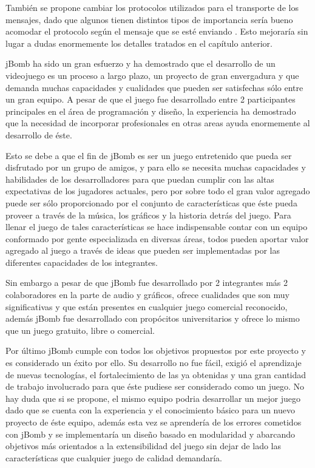 \documentclass[a4paper,12pt,openany,oneside]{book}
\begin{document}
También se propone cambiar los protocolos utilizados para el transporte de los mensajes, dado que algunos tienen distintos tipos de importancia sería bueno acomodar el protocolo según el mensaje que se esté enviando \cite{VALVE1}. Esto mejoraría sin lugar a dudas enormemente los detalles tratados en el capítulo anterior.

jBomb ha sido un gran esfuerzo y ha demostrado que el desarrollo de un videojuego es un proceso a largo plazo, un proyecto de gran envergadura y que demanda muchas capacidades y cualidades que pueden ser satisfechas sólo entre un gran equipo. A pesar de que el juego fue desarrollado entre 2 participantes principales en el área de programación y diseño, la experiencia ha demostrado que la necesidad de incorporar profesionales en otras areas ayuda enormemente al desarrollo de éste.

Esto se debe a que el fin de jBomb es ser un juego entretenido que pueda ser disfrutado por un grupo de amigos, y para ello se necesita muchas capacidades y habilidades de los desarrolladores para que puedan cumplir con las altas expectativas de los jugadores actuales, pero por sobre todo el gran valor agregado puede ser sólo proporcionado por el conjunto de características que éste pueda proveer a través de la música, los gráficos y la historia detrás del juego. Para llenar el juego de tales características se hace indispensable contar con un equipo conformado por gente especializada en diversas áreas, todos pueden aportar valor agregado al juego a través de ideas que pueden ser implementadas por las diferentes capacidades de los integrantes.

Sin embargo a pesar de que jBomb fue desarrollado por 2 integrantes más 2 colaboradores en la parte de audio y gráficos, ofrece cualidades que son muy significativas y que están presentes en cualquier juego comercial reconocido, además jBomb fue desarrollado con propócitos universitarios y ofrece lo mismo que un juego gratuito, libre o comercial.

Por último jBomb cumple con todos los objetivos propuestos por este proyecto y es considerado un éxito por ello. Su desarrollo no fue fácil, exigió el aprendizaje de nuevas tecnologías, el fortalecimiento de las ya obtenidas y una gran cantidad de trabajo involucrado para que éste pudiese ser considerado como un juego. No hay duda que si se propone, el mismo equipo podria desarrollar un mejor juego dado que se cuenta con la experiencia y el conocimiento básico para un nuevo proyecto de éste equipo, además esta vez se aprendería de los errores cometidos con jBomb y se implementaría un diseño basado en modularidad y abarcando objetivos más orientados a la extensibilidad del juego sin dejar de lado las características que cualquier juego de calidad demandaría.


\end{document}

